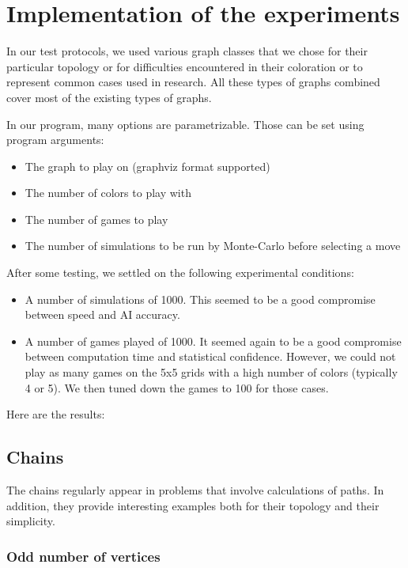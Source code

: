 \section{Implementation of the experiments}

In our test protocols, we used various graph classes that we chose for their particular topology or for difficulties encountered in their coloration or to represent common cases used in research. All these types of graphs combined cover most of the existing types of graphs.

In our program, many options are parametrizable. Those can be set using program arguments:
\begin{itemize}
\item The graph to play on (graphviz format supported)
\item The number of colors to play with
\item The number of games to play
\item The number of simulations to be run by Monte-Carlo before selecting a move
\end{itemize}
After some testing, we settled on the following experimental conditions:
\begin{itemize}
\item A number of simulations of 1000. This seemed to be a good compromise between speed and AI accuracy.
\item A number of games played of 1000. It seemed again to be a good compromise between computation time and statistical confidence. However, we could not play as many games on the 5x5 grids with a high number of colors (typically 4 or 5). We then tuned down the games to 100 for those cases. 
\end{itemize}


Here are the results:\\

\subsection{Chains}

The chains regularly appear in problems that involve calculations of paths. In addition, they provide interesting examples both for their topology and their simplicity.

\subsubsection{Odd number of vertices}

